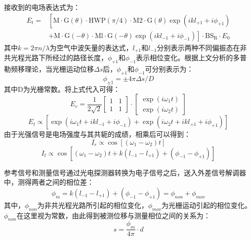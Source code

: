 \documentclass[type=master,oneside]{fduthesis}
\begin{document}
接收到的电场表达式为：
\begin{equation}
  \begin{aligned}
    E_{t}= & \left[  \mathrm{M}  \cdot\mathrm{G}(\theta)\cdot \mathrm{HWP}(\pi / 4) \cdot  \mathrm{M2} \cdot\mathrm{G}(\theta) \exp \left(i k l_{+1}+i \phi_{+1}\right)\right.                   \\
           & \left.+\mathrm{M} \cdot \mathrm{G}(-\theta) \cdot \mathrm{Ml} \cdot \mathrm{G}(-\theta) \exp \left(i k l_{-1}+i \phi_{-1}\right) \right] \cdot \mathrm{BS}_{\mathrm{R}} \cdot E_{0}
  \end{aligned}
\end{equation}
其中$k=2 \pi n / \lambda$为空气中波矢量的表达式，$l_{+1}$和$l_{-1}$分别表示两种不同偏振态在非共光程光路下所经过的路径长度，$\phi_{+1}$和$\phi_{-1}$表示相位变化。根据上文分析的多普勒频移理论，当光栅运动位移$\Delta s$后，$\phi_{+1}$和$\phi_{-1}$可分别表示为：
\begin{equation}
  \phi_{\pm 1}=\pm 4 \pi \Delta s / D
\end{equation}
其中D为光栅常数。将上式代入可得：
\begin{equation}
  E_{r}=\frac{1}{2 \sqrt{2}}\left[\begin{array}{ll}
      1 & 1 \\
      1 & 1
    \end{array}\right] \cdot\left[\begin{array}{l}
      \exp \left(i \omega_{1} t\right) \\
      \exp \left(i \omega_{2} t\right)
    \end{array}\right]
\end{equation}
\begin{equation}
  E_{t} \propto \left[\exp \left(i \omega_{1} t+i k l_{-1}+i \phi_{-1}\right)+\exp \left(i \omega_{2} t+i k l_{+1}+i \phi_{+1}\right)\right]
\end{equation}
由于光强信号是电场强度与其共轭的成绩，相乘后可以得到：
\begin{equation}
  I_{r} \propto \cos \left[\left(\omega_{1}-\omega_{2}\right) t\right]
\end{equation}
\begin{equation}
  I_{t} \propto  \cos \left[\left(\omega_{1}-\omega_{2}\right) t+k\left(l_{-1}-l_{+1}\right)+\left(\phi_{-1}-\phi_{+1}\right)\right]
\end{equation}

参考信号和测量信号通过光电探测器转换为电子信号之后，送入外差信号解调器中，测得两者之间的相位差：
\begin{equation}
  \phi_{m}=k\left(l_{-1}-l_{+1}\right)+\left(\phi_{-1}-\phi_{+1}\right)=\phi_{non}+\phi_{mov}
\end{equation}
其中，$\phi_{non}$为非共光程光路所引起的相位变化，$\phi_{mov}$为光栅运动引起的相位变化。$\phi_{non}$在这里视为常数，由此得到被测位移与测量相位之间的关系为：
\begin{equation}
  s=\frac{\phi_{m}}{4 \pi} \cdot d
\end{equation}
\end{document}
